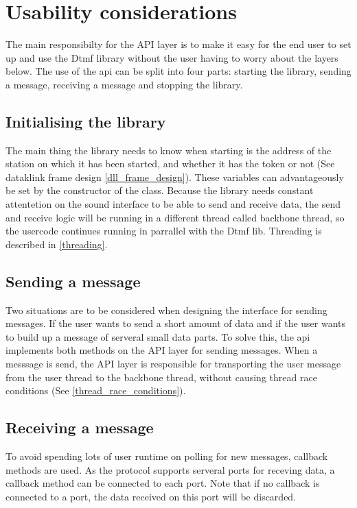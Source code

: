 \section{Usability considerations}
The main responsibilty for the API layer is to make it easy for the end user to set up and use the Dtmf library without the user having to worry about the layers below. The use of the api can be split into four parts: starting the library, sending a message, receiving a message and stopping the library. 

\subsection{Initialising the library}
The main thing the library needs to know when starting is the address of the station on which it has been started, and whether it has the token or not (See dataklink frame design \ref{dll_frame_design}). These variables can  advantageously be set by the constructor of the class. Because the library needs constant attentetion on the sound interface to be able to send and receive data, the send and receive logic will be running in a different thread called backbone thread, so the usercode continues running in parrallel with the Dtmf lib. Threading is described in \ref{threading}.

\subsection{Sending a message}
Two situations are to be considered when designing the interface for sending messages. If the user wants to send a short amount of data and if the user wants to build up a message of serveral small data parts. To solve this, the api implements both methods on the API layer for sending messages. When a messsage is send, the API layer is responsible for transporting the user message from the user thread to the backbone thread, without causing thread race conditions (See \ref{thread_race_conditions}).

\subsection{Receiving a message}
To avoid spending lots of user runtime on polling for new messages, callback methods are used. As the protocol supports serveral ports for receving data, a callback method can be connected to each port. Note that if no callback is connected to a port, the data received on this port will be discarded.

